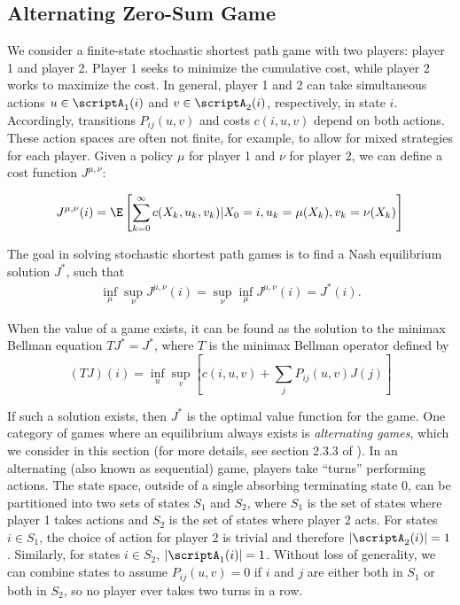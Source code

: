 \documentclass[12pt]{article}
\begin{document}
\subsection{Alternating Zero-Sum Game} 
We consider a finite-state stochastic shortest path game with two players: player 1 and player 2.  Player 1 seeks to minimize the cumulative cost, while player 2 works to maximize the cost. In general, player 1 and 2 can take simultaneous actions $u \in \scriptA_1(i)$ and $v \in \scriptA_2(i)$, respectively, in state $i$. Accordingly, transitions $P_{ij}(u,v)$ and costs $c(i,u,v)$ depend on both actions. These action spaces are often not finite, for example, to allow for mixed strategies for each player. Given a policy $\mu$ for player 1 and $\nu$ for player 2, we can define a cost function $J^{\mu, \nu}$:

\begin{equation*}
    J^{\mu, \nu}(i) = \E\left[\sum_{k=0}^\infty c(X_k, u_k, v_k) | X_0 = i, u_k = \mu(X_k), v_k = \nu(X_k)\right]
\end{equation*}

The goal in solving stochastic shortest path games is to find a Nash equilibrium solution $J^*$, such that
\begin{align*}
    \inf_{\mu} \sup_{\nu} J^{\mu, \nu}(i) = \sup_{\nu} \inf_{\mu} J^{\mu, \nu}(i) = J^*(i). 
\end{align*}

When the value of a game exists, it can be found as the solution to the minimax Bellman equation $TJ^* = J^*$, where $T$ is the minimax Bellman operator defined by
\begin{equation*}
    (TJ)(i) = \inf_u \sup_v \left[c(i, u, v) + \sum_{j}P_{ij}(u,v)J(j)\right]
\end{equation*}

If such a solution exists, then $J^*$ is the optimal value function for the game. One category of games where an equilibrium always exists is \emph{alternating games}, which we consider in this section (for more details, see section 2.3.3 of \cite{patekthesis}). In an alternating (also known as sequential) game, players take ``turns'' performing actions. The state space, outside of a single absorbing terminating state $0$, can be partitioned into two sets of states $S_1$ and $S_2$, where $S_1$ is the set of states where player 1 takes actions and $S_2$ is the set of states where player 2 acts. For states $i \in S_1$, the choice of action for player 2 is trivial and therefore $|\scriptA_2(i)| = 1$. Similarly, for states $i \in S_2$, $|\scriptA_1(i)| = 1$. Without loss of generality, we can combine states to assume $P_{ij}(u,v) = 0$ if $i$ and $j$ are either both in $S_1$ or both in $S_2$, so no player ever takes two turns in a row.
\end{document}
